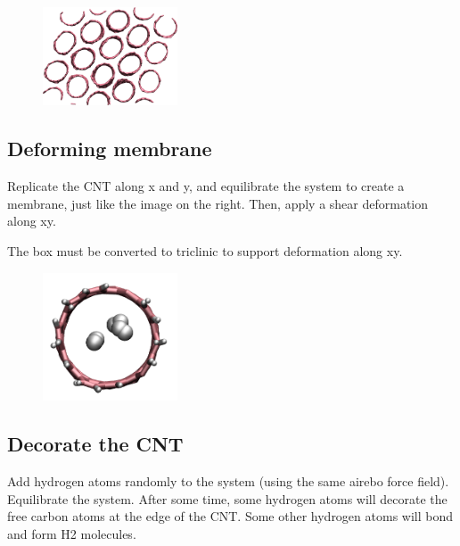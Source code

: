 \hspace{-0.45cm}\begin{figure}
\includegraphics[width=4cm]{tutorials/level1/breaking-a-carbon-nanotube/shared-light.png}
\end{figure}

\noindent \subsection{Deforming membrane}

Replicate the CNT along x and y, and equilibrate the system to 
create a membrane, just like the image on the right. 
Then, apply a shear deformation along xy.

\begin{tcolorbox}[colback=mylightblue!5!white,colframe=mylightblue!75!black,title=Hints (click to reveal)]
The box must be converted to triclinic to support deformation
along xy.
\end{tcolorbox}

\noindent \hspace{-0.45cm}\begin{figure}
\includegraphics[width=4cm]{tutorials/level1/breaking-a-carbon-nanotube/CH-light.png}
\end{figure}

\noindent \subsection{Decorate the CNT}

Add hydrogen atoms randomly to the system (using the same
airebo force field). 
Equilibrate the system. After some time, some hydrogen atoms will 
decorate the free carbon atoms at the edge of the CNT. Some 
other hydrogen atoms will bond and form H2 molecules. 

